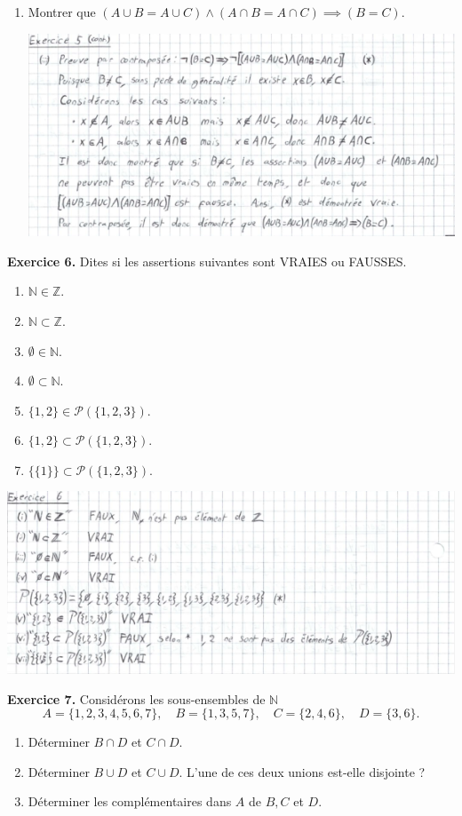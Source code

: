 \documentclass[a4paper, 10pt]{report}
\begin{document}
\begin{enumerate}[label=(\roman*)]
		\item Montrer que $(A \cup B = A \cup C) \land
			(A \cap B = A \cap C) \implies (B = C)$.
		
		\includegraphics{ex05-3.png}
		
	\end{enumerate}
	
	\newpage
	
	\noindent
	\textbf{Exercice 6.} Dites si les assertions suivantes sont
	VRAIES ou FAUSSES.
	\begin{enumerate}[label=(\roman*)]
		\item $\mathbb{N} \in \mathbb{Z}$.
		\item $\mathbb{N} \subset \mathbb{Z}$.
		\item $\emptyset \in \mathbb{N}$.
		\item $\emptyset \subset \mathbb{N}$.
		\item $\{1,2\} \in \mathcal{P}(\{1,2,3\})$.
		\item $\{1,2\} \subset \mathcal{P}(\{1,2,3\})$.
		\item $\{\{1\}\} \subset \mathcal{P}(\{1,2,3\})$.
	\end{enumerate}
	
	\includegraphics{ex06.png}
	
	\vspace{5mm}
	\noindent
	\textbf{Exercice 7.} Considérons les sous-ensembles de $\mathbb{N}$
	\[
		A = \{1,2,3,4,5,6,7\}, \quad B = \{1,3,5,7\}, \quad
			C = \{2,4,6\}, \quad D = \{3,6\}.
	\]
	\begin{enumerate}[label=(\roman*)]
		\item Déterminer $B \cap D$ et $C \cap D$.
		\item Déterminer $B \cup D$ et $C \cup D$. L'une de
		ces deux unions est-elle disjointe ?
		\item Déterminer les complémentaires dans $A$ de $B, C$ et $D$.
	\end{enumerate}
	
\end{document}
